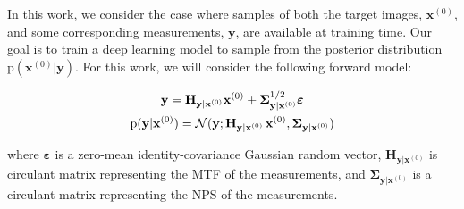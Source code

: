 \documentclass[12pt,]{article}
\begin{document}
In this work, we consider the case where samples of both the target images, $\mathbf{x}^{(0)}$, and some corresponding measurements, $\mathbf{y}$, are available at training time. Our goal is to train a deep learning model to sample from the posterior distribution $\text{p}(\mathbf{x}^{(0)}|\mathbf{y})$. For this work, we will consider the following forward model:



\begin{gather}
    \mathbf{y} = \mathbf{H}_{\mathbf{y}|\mathbf{x}^{(0)}} \mathbf{x}^{(0)} + \boldsymbol{\Sigma}_{\mathbf{y}|\mathbf{x}^{(0)}}^{1/2} \boldsymbol{\varepsilon} \\
    \text{p}(\mathbf{y}|\mathbf{x}^{(0)}) = \mathcal{N}(\mathbf{y}; \mathbf{H}_{\mathbf{y}|\mathbf{x}^{(0)}} \hspace{0.5mm} \mathbf{x}^{(0)}, \boldsymbol{\Sigma}_{\mathbf{y}|\mathbf{x}^{(0)}})
    \label{eq:forward_model}
\end{gather}

\noindent where $\boldsymbol{\varepsilon}$ is a zero-mean identity-covariance Gaussian random vector, $\mathbf{H}_{\mathbf{y}|\mathbf{x}^{(0)}}$ is circulant matrix representing the MTF of the measurements, and $\boldsymbol{\Sigma}_{\mathbf{y}|\mathbf{x}^{(0)}}$ is a circulant matrix representing the NPS of the measurements. 


\end{document}

